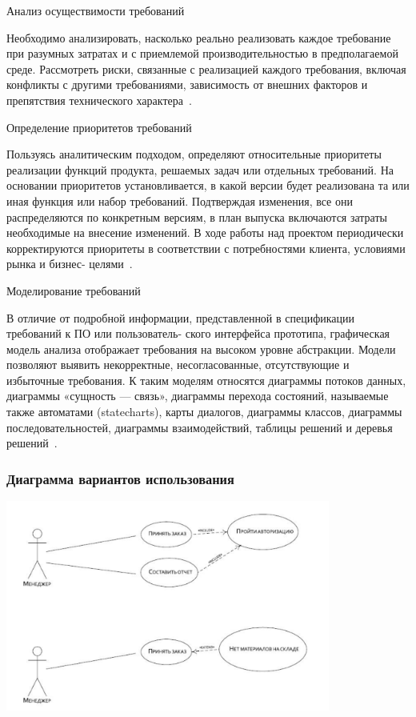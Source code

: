 \documentclass{../industrial-development}
\begin{document}
\lecturenotes

\alert{Анализ осуществимости требований}

Необходимо анализировать, насколько реально реализовать каждое требование при разумных затратах и с приемлемой производительностью в предполагаемой среде. Рассмотреть риски, связанные с реализацией каждого требования, включая конфликты с другими требованиями, зависимость от внешних факторов и препятствия технического характера~\cite[с.~48]{Wiegers}.

\alert{Определение приоритетов требований}

Пользуясь аналитическим подходом, определяют относительные приоритеты реализации функций продукта, решаемых задач или отдельных требований.
На основании приоритетов установливается, в какой версии будет реализована та или иная функция или набор требований. Подтверждая изменения, все они распределяются по конкретным версиям, в план выпуска включаются затраты необходимые на внесение изменений.
В ходе работы над проектом периодически корректируются приоритеты в соответствии с потребностями клиента, условиями рынка и бизнес-
целями~\cite[с.~48-49]{Wiegers}.

\alert{Моделирование требований}

В отличие от подробной информации, представленной в спецификации требований к ПО или пользователь-
ского интерфейса прототипа, графическая модель анализа отображает требования на высоком уровне абстракции. Модели позволяют выявить некорректные, несогласованные, отсутствующие и избыточные
требования. К таким моделям относятся диаграммы потоков данных, диаграммы «сущность — связь», диаграммы перехода состояний, называемые также автоматами (statecharts), карты диалогов, диаграммы
классов, диаграммы последовательностей, диаграммы взаимодействий, таблицы решений и деревья решений~\cite[с.~49]{Wiegers}.


\begin{frame} \frametitle {Диаграмма вариантов использования}
 \centerline{\includegraphics[width=0.8\textwidth]{pict4.pdf}}
\end{frame}
\end{document}
